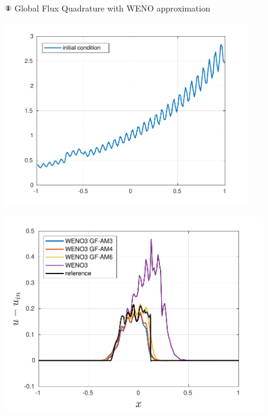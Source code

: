 \begin{frame}[t]{\includegraphics[width=0.3cm]{circle1} Global Flux Quadrature  with WENO approximation}
{\begin{minipage}{0.5\textwidth}
\centering\includegraphics[width=0.8\textwidth]{../figs/WENO-FD/figures/Burgers/perturbations/initial_cond_DISC_n150} 
\end{minipage}\hfill
\begin{minipage}{0.5\textwidth}
\centering\includegraphics[width=0.85\textwidth]{../figs/WENO-FD/figures/Burgers/perturbations/weno3_AM_DISC_n150} 
\end{minipage}
}

\end{frame}
